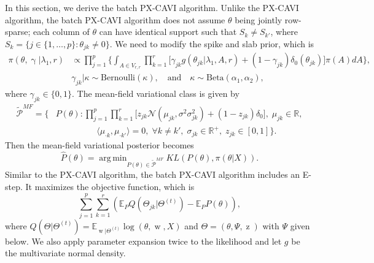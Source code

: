 \documentclass[pdftex, noinfoline, letter]{imsart}
\DeclareMathOperator*{\argmin}{arg\,min}
\DeclareMathOperator*{\bw}{{w}}
\DeclareMathOperator*{\bgamma}{{\gamma}}
\DeclareMathOperator*{\bz}{ z}
\theoremstyle{plain}
\begin{document}
In this section, we derive the batch PX-CAVI algorithm. Unlike the PX-CAVI algorithm, the batch PX-CAVI algorithm does not assume $\theta$ being jointly row-sparse; each column of $\theta$ can have identical support such that $S_k \neq S_{k'}$, where $S_k = \{j \in \{1, \dots, p\}: \theta_{jk} \neq 0\}$. 
We need to modify the spike and slab prior, which is
\begin{align}
\pi(\theta, \bgamma|\lambda_1, r) 
& \propto
\prod_{j=1}^p 
\Bigg\{
\int_{A \in V_{r, r}} 
\prod_{k=1}^r
\Big[
\gamma_{jk} g(\theta_{jk}|\lambda_1, A, r) + (1-\gamma_{jk}) \delta_0(\theta_{jk})
\Big] \pi(A) dA
\Bigg\}, \\
&\gamma_{jk}|\kappa \sim \text{Bernoulli}(\kappa), \quad\text{and}\quad \kappa \sim \text{Beta}(\alpha_1, \alpha_2), \nonumber 
\end{align}
where $\gamma_{jk} \in \{0, 1\}$. 
The mean-field variational class is given by
\begin{equation}
\begin{split}
\widetilde{\mathcal{P}}^{MF} = \Bigg\{
& P(\theta): \prod_{j=1}^p \prod_{k=1}^r \Big[z_{jk} \mathcal{N}(\mu_{jk}, \sigma^2 \sigma_{jk}^2)
+ (1-z_{jk}) \delta_0\Big],\; \mu_{jk} \in \mathbb{R},\\
&\hspace{2cm} \langle \mu_{\cdot k}, \mu_{\cdot k'} \rangle = 0, \;\forall k \neq k', \;
\sigma_{jk} \in \mathbb{R}^+, \;z_{jk} \in [0, 1]
\Bigg\}.
\end{split}
\end{equation}
Then the mean-field variational posterior becomes
$$
\widehat P(\theta) = \argmin_{P(\theta) \in \widetilde{\mathcal{P}}^{MF}} KL(P(\theta), \pi(\theta|X)).
$$
Similar to the PX-CAVI algorithm, the batch PX-CAVI algorithm includes an E-step. 
It maximizes the objective function, which is 
$$
\sum_{j=1}^p \sum_{k=1}^r \left(
\mathbb{E}_P Q(\Theta_{jk}|\Theta^{(t)}) - \mathbb{E}_P P(\theta)
\right),
$$
where $Q(\Theta|\Theta^{(t)}) = \mathbb{E}_{\bw|\Theta^{(t)}} \log (\theta, \bw, X)$ and 
$\Theta = (\theta, \Psi, \bz)$ with $\Psi$ given below.
We also apply parameter expansion twice to the likelihood and let $g$ be the multivariate normal density.
\end{document}
